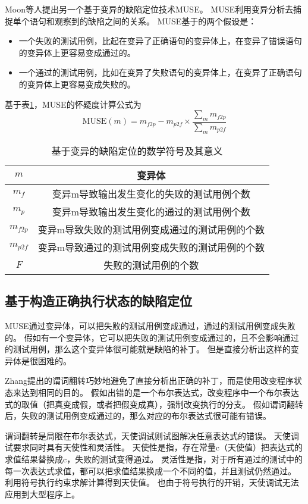 Moon等人提出另一个基于变异的缺陷定位技术MUSE\parencite{Moon2014Ask}。
MUSE利用变异分析去捕捉单个语句和观察到的缺陷之间的关系。
MUSE基于的两个假设是：
\begin{itemize}
\item 一个失败的测试用例，比起在变异了正确语句的变异体上，在变异了错误语句的变异体上更容易变成通过的。
\item 一个通过的测试用例，比如在变异了失败语句的变异体上，在变异了正确语句的变异体上更容易变成失败的。
\end{itemize}
基于表\ref{mutant_symbol}，MUSE的怀疑度计算公式为
$$
\mathrm{MUSE}(m) = m_{f2p} - m_{p2f} \times \frac{\sum_{m}^{}{m_{f2p}}}{\sum_{m}^{}{m_{p2f}}}
$$

\begin{table}
\centering
\begin{tabular}{|c|c|}
\hline
$m$ & 变异体 \\
\hline
$m_f$ & 变异m导致输出发生变化的失败的测试用例个数 \\
\hline
$m_p$ & 变异m导致输出发生变化的通过的测试用例个数 \\
\hline
$m_{f2p}$ & 变异m导致失败的测试用例变成通过的测试用例的个数 \\
\hline
$m_{p2f}$ & 变异m导致通过的测试用例变成失败的测试用例的个数 \\
\hline
$F$ & 失败的测试用例的个数 \\
\hline
\end{tabular}
\caption{基于变异的缺陷定位的数学符号及其意义}
\label{mutant_symbol}
\end{table}

\subsection{基于构造正确执行状态的缺陷定位}

MUSE通过变异体，可以把失败的测试用例变成通过，通过的测试用例变成失败的。
假如有一个变异体，它可以把失败的测试用例变成通过的，且不会影响通过的测试用例，那么这个变异体很可能就是缺陷的补丁。
但是直接分析出这样的变异体是很困难的。

Zhang提出的谓词翻转\parencite{Zhang2006Locating}巧妙地避免了直接分析出正确的补丁，而是使用改变程序状态来达到相同的目的。
假如出错的是一个布尔表达式，改变程序中一个布尔表达式的取值（把真变成假，或者把假变成真），强制改变执行的分支。
假如谓词翻转后，失败的测试用例变成通过的，那么对应的布尔表达式很可能有错误。

谓词翻转是局限在布尔表达式，天使调试\parencite{Chandra2011Angelic}则试图解决任意表达式的错误。
天使调试要求同时具有天使性和灵活性。
天使性是指，存在常量c（天使值）把表达式的求值结果替换成c，失败的测试变得通过。
灵活性是指，对于所有通过的测试中的每一次表达式求值，都可以把求值结果换成一个不同的值，并且测试仍然通过。
利用符号执行约束求解计算得到天使值。
也由于符号执行的开销，天使调试无法应用到大型程序上。

